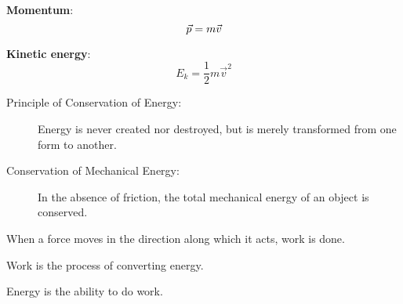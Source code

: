 \textbf{Momentum}:
\begin{equation}
\vec{p} = m\vec{v}
\end{equation}

\textbf{Kinetic energy}:
\begin{equation}
E_{k} = \frac{1}{2}m\vec{v}^{2}
\end{equation}

\begin{description}
\item[Principle of Conservation of Energy:] Energy is never created nor
destroyed, but is merely transformed from one form to another.
\item[Conservation of Mechanical Energy:] In the absence of friction,
the total mechanical energy of an object is conserved.
\end{description}

When a force moves     in the direction along which it acts,   work is done.

Work is the process of converting energy.

Energy is the ability to do work.

